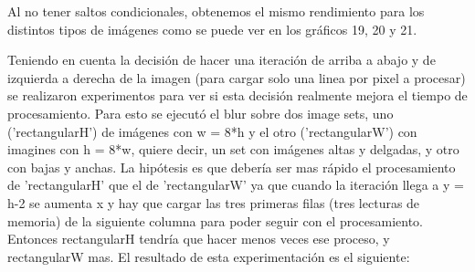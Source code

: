 \documentclass[a4paper]{article}
\begin{document}
Al no tener saltos condicionales, obtenemos el mismo rendimiento para los distintos tipos de imágenes como se puede ver en los gráficos 19, 20 y 21.

Teniendo en cuenta la decisión de hacer una iteración de arriba a abajo y de izquierda a derecha de la imagen (para cargar solo una linea por pixel a procesar) se realizaron experimentos para ver si esta decisión realmente mejora el tiempo de procesamiento. Para esto se ejecutó el blur sobre dos image sets, uno ('rectangularH') de imágenes con w = 8*h y el otro ('rectangularW') con imagines con h = 8*w, quiere decir, un set con imágenes altas y delgadas, y otro con bajas y anchas. La hipótesis es que debería ser mas rápido el procesamiento de 'rectangularH' que el de 'rectangularW' ya que cuando la iteración llega a y = h-2 se aumenta x y hay que cargar las tres primeras filas (tres lecturas de memoria) de la siguiente columna para poder seguir con el procesamiento. Entonces rectangularH tendría que hacer menos veces ese proceso, y rectangularW mas. El resultado de esta experimentación es el siguiente:
\end{document}
